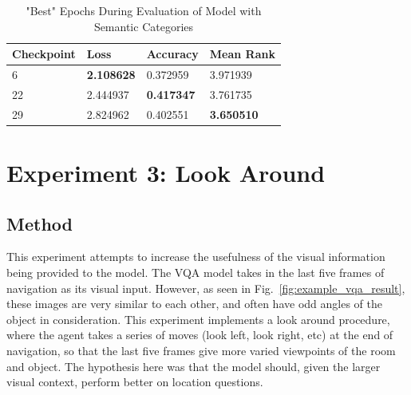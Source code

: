 \begin{table}[H]
\centering
\caption{"Best" Epochs During Evaluation of Model with Semantic Categories}
\begin{tabular}{l | l | l | l}
Checkpoint & Loss & Accuracy & Mean Rank \\
\hline
6 & \textbf{2.108628} & 0.372959 & 3.971939 \\
22 & 2.444937 & \textbf{0.417347} & 3.761735 \\
29 & 2.824962 & 0.402551 & \textbf{3.650510} 
\end{tabular}
\label{tab:best_category}
\end{table}

\section{Experiment 3: Look Around}
\subsection{Method}
This experiment attempts to increase the usefulness of the visual information being provided to the model. The VQA model takes in the last five frames of navigation as its visual input. However, as seen in Fig.~\ref{fig:example_vqa_result}, these images are very similar to each other, and often have odd angles of the object in consideration. This experiment implements a look around procedure, where the agent takes a series of moves (look left, look right, etc) at the end of navigation, so that the last five frames give more varied viewpoints of the room and object. The hypothesis here was that the model should, given the larger visual context, perform better on location questions. \newline
{}

